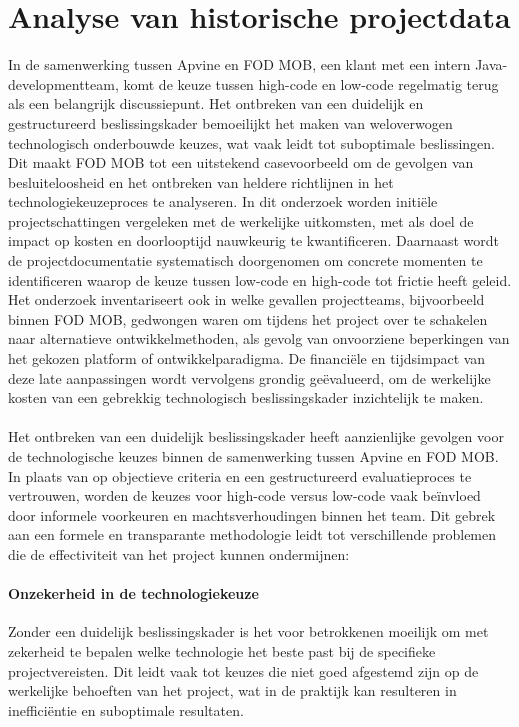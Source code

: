 \section{Analyse van historische projectdata}
In de samenwerking tussen Apvine en \gls{FOD MOB}, een klant met een intern Java-developmentteam, komt de keuze tussen high-code en low-code regelmatig terug als een belangrijk discussiepunt. Het ontbreken van een duidelijk en gestructureerd beslissingskader bemoeilijkt het maken van weloverwogen technologisch onderbouwde keuzes, wat vaak leidt tot suboptimale beslissingen. Dit maakt \gls{FOD MOB} tot een uitstekend casevoorbeeld om de gevolgen van besluiteloosheid en het ontbreken van heldere richtlijnen in het technologiekeuzeproces te analyseren. In dit onderzoek worden initiële projectschattingen vergeleken met de werkelijke uitkomsten, met als doel de impact op kosten en doorlooptijd nauwkeurig te kwantificeren. Daarnaast wordt de projectdocumentatie systematisch doorgenomen om concrete momenten te identificeren waarop de keuze tussen low-code en high-code tot frictie heeft geleid. Het onderzoek inventariseert ook in welke gevallen projectteams, bijvoorbeeld binnen \gls{FOD MOB}, gedwongen waren om tijdens het project over te schakelen naar alternatieve ontwikkelmethoden, als gevolg van onvoorziene beperkingen van het gekozen platform of ontwikkelparadigma. De financiële en tijdsimpact van deze late aanpassingen wordt vervolgens grondig geëvalueerd, om de werkelijke kosten van een gebrekkig technologisch beslissingskader inzichtelijk te maken.
\\
\\
Het ontbreken van een duidelijk beslissingskader heeft aanzienlijke gevolgen voor de technologische keuzes binnen de samenwerking tussen Apvine en \gls{FOD MOB}. In plaats van op objectieve criteria en een gestructureerd evaluatieproces te vertrouwen, worden de keuzes voor high-code versus low-code vaak beïnvloed door informele voorkeuren en machtsverhoudingen binnen het team. Dit gebrek aan een formele en transparante methodologie leidt tot verschillende problemen die de effectiviteit van het project kunnen ondermijnen:
\paragraph{Onzekerheid in de technologiekeuze}
Zonder een duidelijk beslissingskader is het voor betrokkenen moeilijk om met zekerheid te bepalen welke technologie het beste past bij de specifieke projectvereisten. Dit leidt vaak tot keuzes die niet goed afgestemd zijn op de werkelijke behoeften van het project, wat in de praktijk kan resulteren in inefficiëntie en suboptimale resultaten.

